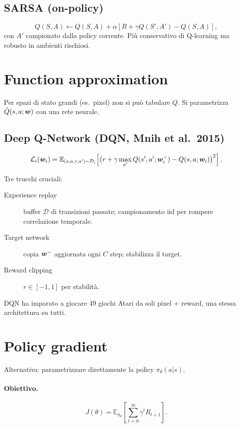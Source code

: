 \subsection{SARSA (on-policy)}
\[
Q(S,A) \leftarrow Q(S,A) + \alpha[R + \gamma Q(S', A') - Q(S, A)],
\]
con $A'$ campionato dalla policy corrente. Più conservativo di Q-learning ma robusto in ambienti rischiosi.

\section{Function approximation}

Per spazi di stato grandi (es.\ pixel) non si può tabulare $Q$. Si parametrizza $\hat Q(s, a; \bm{w})$ con una rete neurale.

\subsection{Deep Q-Network (DQN, Mnih et al.\ 2015)}

\begin{equation}
\mathcal{L}_i(\bm{w}_i) = \mathbb{E}_{(s,a,r,s')\sim \mathcal{D}_i}\!\left[\big(r + \gamma \max_{a'} Q(s', a'; \bm{w}_i^-) - Q(s, a; \bm{w}_i)\big)^2\right].
\end{equation}

Tre trucchi cruciali:
\begin{description}
  \item[Experience replay] buffer $\mathcal{D}$ di transizioni passate; campionamento iid per rompere correlazione temporale.
  \item[Target network] copia $\bm{w}^-$ aggiornata ogni $C$ step; stabilizza il target.
  \item[Reward clipping] $r \in [-1, 1]$ per stabilità.
\end{description}

DQN ha imparato a giocare 49 giochi Atari da soli pixel + reward, una stessa architettura su tutti.

\section{Policy gradient}

Alternativa: parametrizzare direttamente la policy $\pi_\theta(a|s)$.

\paragraph{Obiettivo.}
\[
J(\theta) = \mathbb{E}_{\pi_\theta}\!\left[\sum_{t=0}^\infty \gamma^t R_{t+1}\right].
\]


